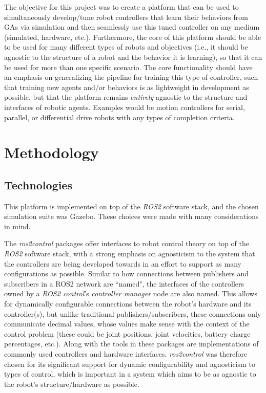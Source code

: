 \documentclass[conference]{IEEEtran}
\begin{document}
	The objective for this project was to create a platform that can be used to simultaneously develop/tune robot controllers that learn their behaviors from \acp{GA} via simulation and then seamlessly use this tuned controller on any medium (simulated, hardware, etc.). Furthermore, the core of this platform should be able to be used for many different types of robots and objectives (i.e., it should be agnostic to the structure of a robot and the behavior it is learning), so that it can be used for more than one specific scenario. The core functionality should have an emphasis on generalizing the pipeline for training this type of controller, such that training new agents and/or behaviors is as lightweight in development as possible, but that the platform remains \textit{entirely} agnostic to the structure and interfaces of robotic agents. Examples would be motion controllers for serial, parallel, or differential drive robots with any types of completion criteria.

	\section{Methodology}

	\subsection{Technologies}

	This platform is implemented on top of the \textit{ROS2} software stack, and the chosen simulation suite was Gazebo. These choices were made with many considerations in mind.

	The \textit{ros2\textunderscore control} packages \cite{ros2-control} offer interfaces to robot control theory on top of the \textit{ROS2} software stack, with a strong emphasis on agnosticism to the system that the controllers are being developed towards in an effort to support as many configurations as possible. Similar to how connections between publishers and subscribers in a ROS2 network are ``named", the interfaces of the controllers owned by a \textit{ROS2 control}'s \textit{controller manager} node are also named. This allows for dynamically configurable connections between the robot's hardware and its controller(s), but unlike traditional publishers/subscribers, these connections only communicate decimal values, whose values make sense with the context of the control problem (these could be joint positions, joint velocities, battery charge percentages, etc.). Along with the tools in these packages are implementations of commonly used controllers and hardware interfaces. \textit{ros2\textunderscore control} was therefore chosen for its significant support for dynamic configurability and agnosticism to types of control, which is important in a system which aims to be as agnostic to the robot's structure/hardware as possible.
\end{document}
